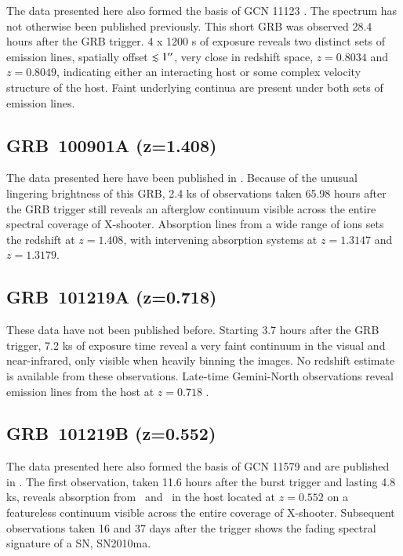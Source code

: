 \documentclass[longauth]{aa}    %
\begin{document}
The data presented here also formed the basis of GCN 11123 \citep{GCN11123}. The
spectrum has not otherwise been published previously. This short GRB was
observed 28.4 hours after the GRB trigger. 4 x 1200 s of exposure reveals two
distinct sets of emission lines, spatially offset $\lesssim 1 ^{\prime\prime} $, very
close in redshift space, $z=0.8034$ and $z=0.8049$, indicating either an
interacting host or some complex velocity structure of the host. Faint
underlying continua are present under both sets of emission lines.

\subsection{GRB~100901A (z=1.408)} \label{100901}

The data presented here have been published in \citet{Hartoog2013}. Because of
the unusual lingering brightness of this GRB, 2.4 ks of observations taken 65.98
hours after the GRB trigger still reveals an afterglow continuum visible across
the entire spectral coverage of X-shooter. Absorption lines from a wide range of
ions sets the redshift at $z=1.408$, with intervening absorption systems at $z =
1.3147$ and $z = 1.3179$.

\subsection{GRB~101219A (z=0.718)} \label{101219A}

These data have not been published before. Starting 3.7 hours after the GRB
trigger, 7.2 ks of exposure time reveal a very faint continuum in the visual and
near-infrared, only visible when heavily binning the images. No redshift
estimate is available from these observations.  Late-time Gemini-North
observations reveal emission lines from the host at $z=0.718$ \citep{GCN11518}.

\subsection{GRB~101219B (z=0.552)} \label{101219B}

The data presented here also formed the basis of GCN 11579 \citep{GCN11579} and
are published in \citet{Sparre2011}. The first observation, taken 11.6 hours
after the burst trigger and lasting 4.8 ks, reveals absorption from \mgii~and
\mgi~in the host located at $z = 0.552$ on a featureless continuum visible
across the entire coverage of X-shooter.  Subsequent observations taken 16 and
37 days after the trigger shows the fading spectral signature of a SN, SN2010ma.
\end{document}
